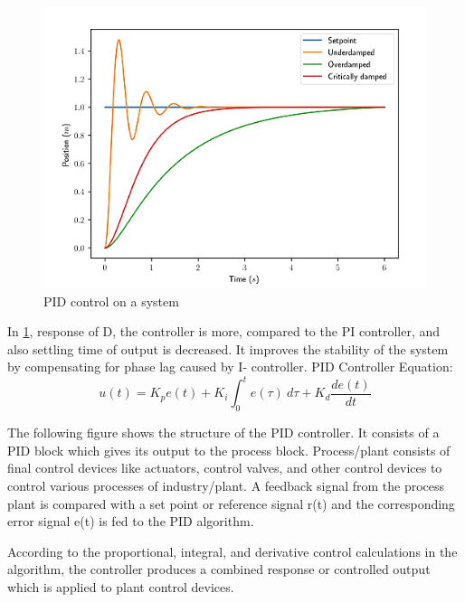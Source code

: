 \documentclass[12pt,a4paper]{book}
\begin{document}
\begin{figure}[h]
  \centering
  \includegraphics[width=14cm]{image10.png}
  \caption{PID control on a system}
  \label{fig:image10}
\end{figure}

In \ref{fig:image10}, response of D, the controller is more, compared to the PI controller, and also settling time of output is decreased. It improves the stability of the system by compensating for phase lag caused by I- controller. PID Controller Equation: 
\begin{equation}
  u\left(t\right)=K_pe\left(t\right)+K_i\int_{0}^{t}{e\left(\tau\right)\ d\tau}+K_d\frac{de(t)}{dt}
  \label{equation:eq3}
\end{equation}

The following figure shows the structure of the PID controller. It consists of a PID block which gives its output to the process block. Process/plant consists of final control devices like actuators, control valves, and other control devices to control various processes of industry/plant. A feedback signal from the process plant is compared with a set point or reference signal r(t) and the corresponding error signal e(t) is fed to the PID algorithm.

According to the proportional, integral, and derivative control calculations in the algorithm, the controller produces a combined response or controlled output which is applied to plant control devices.

\end{document}

